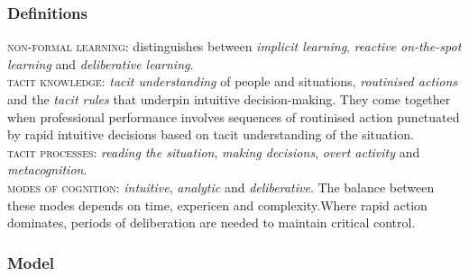 \documentclass[12pt,a4paper]{article}
\begin{document}
    \subsubsection{Definitions}
      \textsc{non-formal learning}: distinguishes between \emph{implicit learning}, \emph{reactive on-the-spot learning} and \emph{deliberative learning}. \\
      \textsc{tacit knowledge}: \emph{tacit understanding} of people and situations, \emph{routinised actions} and the \emph{tacit rules} that underpin intuitive decision-making. They come together when professional performance involves sequences of routinised action punctuated by rapid intuitive decisions based on tacit understanding of the situation. \\
      \textsc{tacit processes}: \emph{reading the situation}, \emph{making decisions}, \emph{overt activity} and \emph{metacognition}.\\
      \textsc{modes of cognition}: \emph{intuitive}, \emph{analytic} and \emph{deliberative}. The balance between these modes depends on time, expericen and complexity.Where rapid action dominates, periods of deliberation are needed to maintain critical control.
    \subsubsection{Model}
\end{document}
